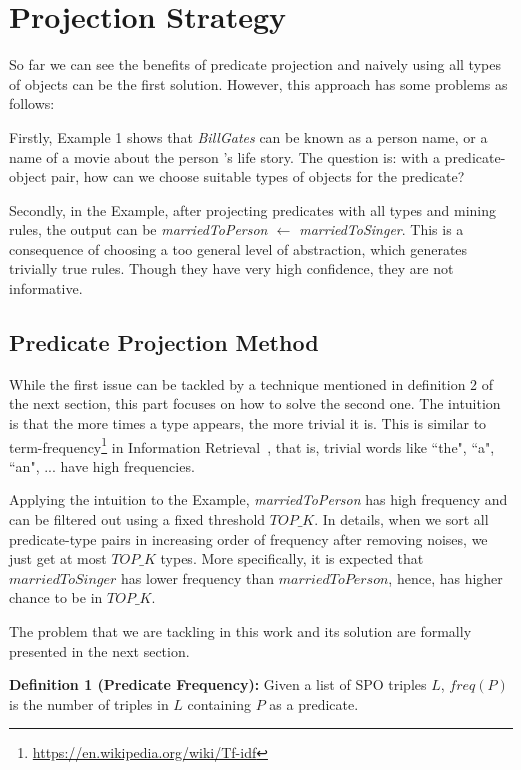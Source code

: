 \documentclass{acm_proc_article-sp}
\begin{document}
\section{Projection Strategy}

So far we can see the benefits of predicate projection and naively using all types of objects can be the first solution. However, this approach has some problems as follows:

Firstly, Example 1 shows that \textit{BillGates} can be known as a person name, or a name of a movie about the person 's life story. The question is: with a predicate-object pair, how can we choose suitable types of objects for the predicate?

Secondly, in the Example, after projecting predicates with all types and mining rules, the output can be \textit{marriedToPerson $\leftarrow$ marriedToSinger}. This is a consequence of choosing a too general level of abstraction, which generates trivially true rules. Though they have very high confidence, they are not informative.

\subsection{Predicate Projection Method}

While the first issue can be tackled by a technique mentioned in definition 2 of the next section, this part focuses on how to solve the second one. The intuition is that the more times a type appears, the more trivial it is. This is similar to term-frequency\footnote{\url{https://en.wikipedia.org/wiki/Tf-idf}} in Information Retrieval~\cite{ref2}, that is, trivial words like ``the", ``a", ``an", ... have high frequencies.

Applying the intuition to the Example, \textit{marriedToPerson} has high frequency and can be filtered out using a fixed threshold $TOP\_K$. In details, when we sort all predicate-type pairs in increasing order of frequency after removing noises, we just get at most $TOP\_K$ types. More specifically, it is expected that $marriedToSinger$ has lower frequency than $marriedToPerson$, hence, has higher chance to be in $TOP\_K$.

The problem that we are tackling in this work and its solution are formally presented in the next section.

\textbf{Definition 1 (Predicate Frequency):} Given a list of SPO triples $L$, $freq(P)$ is the number of triples in $L$ containing $P$ as a predicate.
\end{document}
